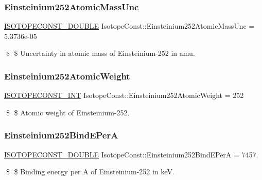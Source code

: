 \subsubsection{\texorpdfstring{Einsteinium252\+Atomic\+Mass\+Unc}{Einsteinium252AtomicMassUnc}}
{\footnotesize\ttfamily \mbox{\hyperlink{group___isotope_const-_macros_ga8f45a7272ce02c0b4c65c44636ed719a}{I\+S\+O\+T\+O\+P\+E\+C\+O\+N\+S\+T\+\_\+\+D\+O\+U\+B\+LE}} Isotope\+Const\+::\+Einsteinium252\+Atomic\+Mass\+Unc = 5.\+3736e-\/05}

\$ \$ Uncertainty in atomic mass of Einsteinium-\/252 in amu. \mbox{\label{group___isotope_const-_einsteinium-_es252_ga59712cbe054685f3d55d8ef456687d2c}} 
\subsubsection{\texorpdfstring{Einsteinium252\+Atomic\+Weight}{Einsteinium252AtomicWeight}}
{\footnotesize\ttfamily \mbox{\hyperlink{group___isotope_const-_macros_ga5f18360b3e99483a35c32d789e62621c}{I\+S\+O\+T\+O\+P\+E\+C\+O\+N\+S\+T\+\_\+\+I\+NT}} Isotope\+Const\+::\+Einsteinium252\+Atomic\+Weight = 252}

\$ \$ Atomic weight of Einsteinium-\/252. \mbox{\label{group___isotope_const-_einsteinium-_es252_gab3851da0ede604449129566154bcc5d9}} 
\subsubsection{\texorpdfstring{Einsteinium252\+Bind\+E\+PerA}{Einsteinium252BindEPerA}}
{\footnotesize\ttfamily \mbox{\hyperlink{group___isotope_const-_macros_ga8f45a7272ce02c0b4c65c44636ed719a}{I\+S\+O\+T\+O\+P\+E\+C\+O\+N\+S\+T\+\_\+\+D\+O\+U\+B\+LE}} Isotope\+Const\+::\+Einsteinium252\+Bind\+E\+PerA = 7457.}

\$ \$ Binding energy per A of Einsteinium-\/252 in keV. \mbox{\label{group___isotope_const-_einsteinium-_es252_gad4a3d7192d2378cc544824189ebdc421}} 
